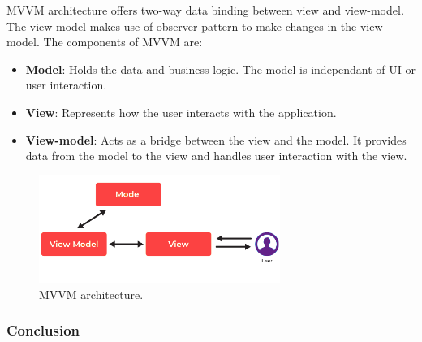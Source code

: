 MVVM architecture offers two-way data binding between view and view-model. The view-model makes use of observer pattern to make changes in the view-model. The components of MVVM are:

\begin{itemize}
    \item \textbf{Model}: Holds the data and business logic. The model is independant of UI or user interaction.
    \item \textbf{View}: Represents how the user interacts with the application.
    \item \textbf{View-model}: Acts as a bridge between the view and the model. It provides data from the model to the view and handles user interaction with the view.
\end{itemize}

\begin{figure}[H]
    \centering
    \includegraphics[width=0.7\textwidth]{assets/images/Research/System/MVVM.png}
    \caption{MVVM architecture.}
    \label{fig:mvvm}
\end{figure}

\subsubsection{Conclusion}

